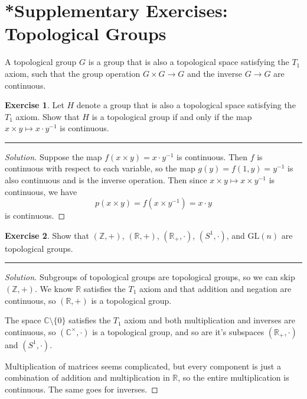 \documentclass{article}
\theoremstyle{definition}
\newtheorem{exercise'}{Exercise}
\begin{document}
\addtocounter{section}{21}
\section*{*Supplementary Exercises: Topological Groups}

A topological group $G$ is a group that is also a topological space satisfying the $T_1$ axiom, such that the group operation $G\times G\to G$ and the inverse $G\to G$ are continuous.

\begin{exercise'}
  Let $H$ denote a group that is also a topological space satisfying the $T_1$ axiom. Show that $H$ is a topological group if and only if the map $x\times y\mapsto x\cdot y^{-1}$ is continuous.
\end{exercise'}
\hrule
\begin{proof}[Solution]
  Suppose the map $f(x\times y) = x\cdot y^{-1}$ is continuous. Then $f$ is continuous with respect to each variable, so the map $g(y) = f(1,y) = y^{-1}$ is also continuous and is the inverse operation. Then since $x\times y\mapsto x\times y^{-1}$ is continuous, we have
  $$p(x\times y) = f(x\times y^{-1}) = x\cdot y$$
  is continuous.
\end{proof}

\pagebreak

\begin{exercise'}
  Show that $(\mathbb{Z},+)$, $(\mathbb{R},+)$, $(\mathbb{R}_+, \cdot)$, $(S^1,\cdot)$, and $\mathrm{GL}(n)$ are topological groups.
\end{exercise'}
\hrule
\begin{proof}[Solution]
  Subgroups of topological groups are topological groups, so we can skip $(\mathbb{Z},+)$. We know $\mathbb{R}$ satisfies the $T_1$ axiom and that addition and negation are continuous, so $(\mathbb{R},+)$ is a topological group.

  The space $\mathbb{C}\setminus\{0\}$ satisfies the $T_1$ axiom and both multiplication and inverses are continuous, so $(\mathbb{C}^\times, \cdot)$ is a topological group, and so are it's subspaces $(\mathbb{R}_+,\cdot)$ and $(S^1,\cdot)$.

  Multiplication of matrices seems complicated, but every component is just a combination of addition and multiplication in $\mathbb{R}$, so the entire multiplication is continuous. The same goes for inverses.
\end{proof}

\pagebreak
\end{document}
